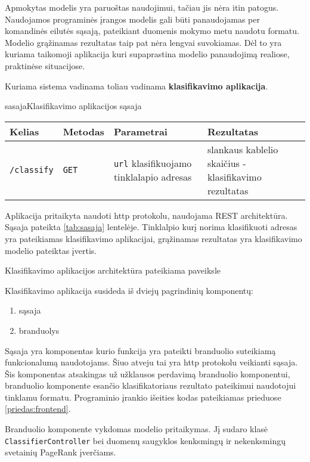 
Apmokytas modelis yra paruoštas naudojimui, tačiau jis nėra itin patogus. Naudojamos programinės įrangos modelis gali
būti panaudojamas per komandinės eilutės sąsają, pateikiant duomenis mokymo metu naudotu formatu. Modelio grąžinamas
rezultatas taip pat nėra lengvai suvokiamas. Dėl to yra kuriama taikomoji aplikacija kuri supaprastina modelio
panaudojimą realiose, praktinėse situacijose.

Kuriama sistema vadinama toliau vadinama \textbf{klasifikavimo aplikacija}.

\begin{ktutable}{sasaja}{Klasifikavimo aplikacijos sąsaja}
    \begin{tabular}{|l|l|p{5cm}|p{5cm}|}
    \hline
        Kelias & Metodas & Parametrai & Rezultatas \\ \hline
        \texttt{/classify} & \texttt{GET} & \texttt{url} klasifikuojamo tinklalapio adresas & slankaus kablelio skaičius - klasifikavimo rezultatas \\ \hline
    \end{tabular}
\end{ktutable}

Aplikacija pritaikyta naudoti http protokolu, naudojama REST architektūra. Sąsaja pateikta \vref{tab:sasaja}
lentelėje. Tinklalpio kurį norima klasifikuoti adresas yra pateikiamas klasifikavimo aplikacijai, grąžinamas
rezultatas yra klasifikavimo modelio pateiktas įvertis.

Klasifikavimo aplikacijos architektūra pateikiama paveiksle 


Klasifikavimo aplikacija susideda iš dviejų pagrindinių komponentų:
\begin{enumerate}
\item sąsaja
\item branduolys
\end{enumerate}
Sąsaja yra komponentas kurio funkcija yra pateikti branduolio suteikiamą funkcionalumą naudotojams. Šiuo atveju
tai yra http protokolu veikianti sąsaja. Šis komponentas atsakingas už užklausos perdavimą branduolio komponentui,
branduolio komponente esančio klasifikatoriaus rezultato pateikimui naudotojui tinklamu formatu. Programinio
įrankio išeities kodas pateikiamas prieduose \vref{priedas:frontend}.

Branduolio komponente vykdomas modelio pritaikymas. Jį sudaro klasė \texttt{ClassifierController} bei duomenų
saugyklos kenksmingų ir nekenksmingų svetainių PageRank įverčiams.

